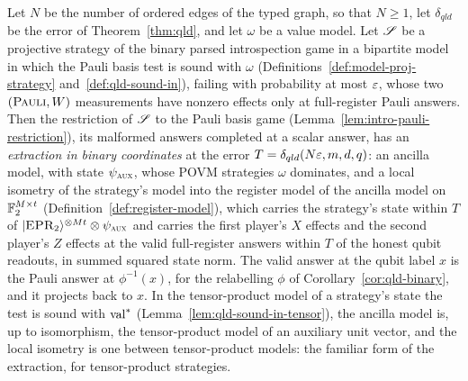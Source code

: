 \begin{lemma}
\label{lem:intro-pauli-extraction}
\leanok
Let $N$ be the number of ordered edges of the typed graph, so that $N \geq 1$, let $\delta_{qld}$ be
the error of Theorem~\ref{thm:qld}, and let $\omega$ be a value model. Let $\mathscr{S}$ be a
projective strategy of the binary parsed introspection game in a bipartite model in which the Pauli
basis test is sound with $\omega$ (Definitions~\ref{def:model-proj-strategy}
and~\ref{def:qld-sound-in}), failing with probability at most $\varepsilon$, whose two $(\textsc{Pauli}, W)$
measurements have nonzero effects only at full-register Pauli answers. Then the restriction of
$\mathscr{S}$ to the Pauli basis game (Lemma~\ref{lem:intro-pauli-restriction}), its malformed answers
completed at a scalar answer, has an \emph{extraction in binary coordinates} at the error $T =
\delta_{qld}(N\varepsilon, m, d, q)$: an ancilla model, with state $\psi_{\textsc{aux}}$, whose POVM strategies
$\omega$ dominates, and a local isometry of the strategy's model into the register model of the
ancilla model on $\mathbb{F}_2^{M \times t}$ (Definition~\ref{def:register-model}), which carries the
strategy's state within $T$ of $|\textsc{EPR}_2\rangle^{\otimes Mt} \otimes \psi_{\textsc{aux}}$ and carries the first
player's $X$ effects and the second player's $Z$ effects at the valid full-register answers within
$T$ of the honest qubit readouts, in summed squared state norm. The valid answer at the qubit label
$x$ is the Pauli answer at $\phi^{-1}(x)$, for the relabelling $\phi$ of
Corollary~\ref{cor:qld-binary}, and it projects back to $x$. In the tensor-product model of a
strategy's state the test is sound with $\mathrm{val}^*$ (Lemma~\ref{lem:qld-sound-in-tensor}), the
ancilla model is, up to isomorphism, the tensor-product model of an auxiliary unit vector, and the
local isometry is one between tensor-product models: the familiar form of the extraction, for
tensor-product strategies.
\end{lemma}


